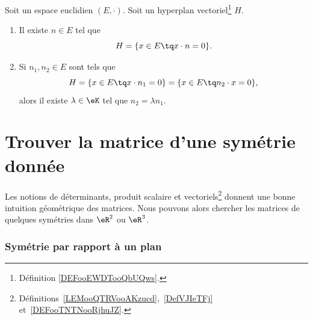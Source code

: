 \begin{proposition}	\label{PROPooHLRRooHWtHSR}
	Soit un espace euclidien \( (E,\cdot)\). Soit un hyperplan vectoriel\footnote{Définition \ref{DEFooEWDTooQbUQws}.} \( H\).
	\begin{enumerate}
		\item
		      Il existe \( n\in E\) tel que
		      \begin{equation}
			      H=\{ x\in E\tq x\cdot n=0 \}.
		      \end{equation}
		\item
		      Si \( n_1,n_2\in E\) sont tels que
		      \begin{equation}
			      H=\{ x\in E\tq x\cdot n_1=0 \}= \{ x\in E\tq n_2\cdot x=0 \},
		      \end{equation}
		      alors il existe \( \lambda\in \eK\) tel que \( n_2=\lambda n_1\).
	\end{enumerate}
\end{proposition}



\section{Trouver la matrice d'une symétrie donnée}
\label{SecMtrSym}

Les notions de déterminants, produit scalaire et vectoriels\footnote{Définitions~\ref{LEMooQTRVooAKzucd},~\ref{DefVJIeTFj} et~\ref{DEFooTNTNooRjhuJZ}.} donnent une bonne intuition géométrique des matrices. Nous pouvons alors chercher les matrices de quelques symétries dans \( \eR^2\) ou \( \eR^3\).

\subsubsection{Symétrie par rapport à un plan}

